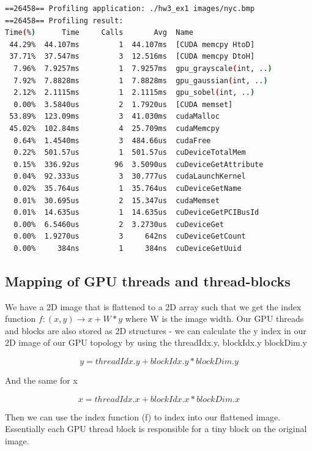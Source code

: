 \documentclass{article}
\begin{document}
\begin{mdframed}[backgroundcolor=codeColor,leftmargin=0.0cm,hidealllines=true,%
  innerleftmargin=0.1cm,innerrightmargin=0.1cm,innertopmargin=0.5cm,innerbottommargin=0.10cm,
  roundcorner=15pt]
\begin{lstlisting}[language=bash]
==26458== Profiling application: ./hw3_ex1 images/nyc.bmp
==26458== Profiling result:
Time(%)      Time     Calls       Avg  Name
 44.29%  44.107ms         1  44.107ms  [CUDA memcpy HtoD]
 37.71%  37.547ms         3  12.516ms  [CUDA memcpy DtoH]
  7.96%  7.9257ms         1  7.9257ms  gpu_grayscale(int, ..)
  7.92%  7.8828ms         1  7.8828ms  gpu_gaussian(int, ..)
  2.12%  2.1115ms         1  2.1115ms  gpu_sobel(int, ..)
  0.00%  3.5840us         2  1.7920us  [CUDA memset]
 53.89%  123.09ms         3  41.030ms  cudaMalloc
 45.02%  102.84ms         4  25.709ms  cudaMemcpy
  0.64%  1.4540ms         3  484.66us  cudaFree
  0.22%  501.57us         1  501.57us  cuDeviceTotalMem
  0.15%  336.92us        96  3.5090us  cuDeviceGetAttribute
  0.04%  92.333us         3  30.777us  cudaLaunchKernel
  0.02%  35.764us         1  35.764us  cuDeviceGetName
  0.01%  30.695us         2  15.347us  cudaMemset
  0.01%  14.635us         1  14.635us  cuDeviceGetPCIBusId
  0.00%  6.5460us         2  3.2730us  cuDeviceGet
  0.00%  1.9270us         3     642ns  cuDeviceGetCount
  0.00%     384ns         1     384ns  cuDeviceGetUuid
\end{lstlisting}
\end{mdframed}


\subsection{Mapping of GPU threads and thread-blocks}%
\label{sub:mapping_of_gpu_threads_and_thread_blocks}

We have a 2D image that is flattened to a 2D array such that we get the index function $f: (x, y) \rightarrow x + W * y$ where W is the image width. Our GPU threads 
and blocks are also stored as 2D structures - we can calculate the y index in our 2D image of our GPU topology by using the threadIdx.y, blockIdx.y blockDim.y

$$ y= threadIdx.y + blockIdx.y * blockDim.y$$ 

And the same for x

$$ x = threadIdx.x + blockIdx.x * blockDim.x $$ 

Then we can use the index function (f) to index into our flattened image. Essentially each GPU thread block is responsible for a tiny block on the original image.
\end{document}
